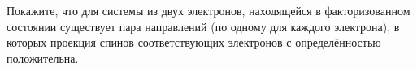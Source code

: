 \documentclass[__main__.tex]{subfiles}
\begin{document}
Покажите, что для системы из двух электронов, находящейся в факторизованном состоянии существует пара направлений (по одному для каждого электрона), в которых проекция спинов соответствующих электронов с определённостью положительна.\\ 

\end{document}
